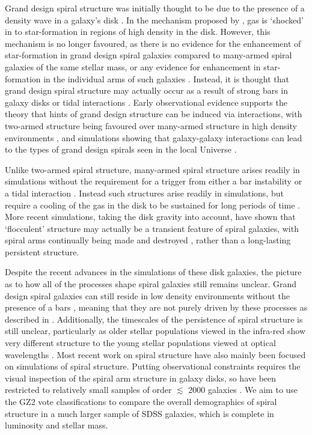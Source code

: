 \documentclass[useAMS,usenatbib]{mn2e}
\begin{document}
Grand design spiral structure was initially thought to be due to the presence of a density wave in a galaxy's disk \citep{Lindblad_63,Lin_64}. In the mechanism proposed by \citet{Lin_64}, gas is `shocked' in to star-formation in regions of high density in the disk. However, this mechanism is no longer favoured, as there is no evidence for the enhancement of star-formation in grand design spiral galaxies compared to many-armed spiral galaxies of the same stellar mass\citep{Romanishin_85,EE_86,Kendall_15}, or any evidence for enhancement in star-formation in the individual arms of such galaxies \citep{Foyle_11,Choi_15}. Instead, it is thought that grand design spiral structure may actually occur as a result of strong bars in galaxy disks or tidal interactions \citep{Kormendy_79}. Early observational evidence supports the theory that hints of grand design structure can be induced via interactions, with two-armed structure being favoured over many-armed structure in high density environments \citep{EE_82,EE_87,Ann_14}, and simulations showing that galaxy-galaxy interactions can lead to the types of grand design spirals seen in the local Universe \citep{Dobbs_10,Semczuk_15}. 

Unlike two-armed spiral structure, many-armed spiral structure arises readily in simulations without the requirement for a trigger from either a bar instability or a tidal interaction \citep{James_78,Sellwood_84}. Instead such structures arise readily in simulations, but require a cooling of the gas in the disk to be sustained for long periods of time \citep{Carlberg_85}. More recent simulations, taking the disk gravity into account, have shown that `flocculent' structure may actually be a transient feature of spiral galaxies, with spiral arms continually being made and destroyed \citep{Bottema_03,Grand_12b,Baba_09,Baba_13,Donghia_13}, rather than a  long-lasting persistent structure.

Despite the recent advances in the simulations of these disk galaxies, the picture as to how all of the processes shape spiral galaxies still remains unclear. Grand design spiral galaxies can still reside in low density environments without the presence of a bars  \citep{EE_82}, meaning that they are not purely driven by these processes as described in \citet{Kormendy_79}. Additionally, the timescales of the persistence of spiral structure is still unclear, particularly as older stellar populations viewed in the infra-red show very different structure to the young stellar populations viewed at optical wavelengths \citep{Block_91,Block_94,Thornley_96}. Most recent work on spiral structure have also mainly been focused on simulations of spiral structure. Putting observational constraints requires the visual inspection of the spiral arm structure in galaxy disks, so have been restricted to relatively small samples of order $\lesssim$ 2000 galaxies \citep{EE_82,EE_89,Ann_13}. We aim to use the GZ2 vote classifications to compare the overall demographics of spiral structure in a much larger sample of SDSS galaxies, which is complete in luminosity and stellar mass.
\end{document}
